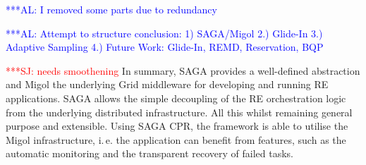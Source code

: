 \documentclass{rspublic}
\newcommand{\alnote}[1]{ {\textcolor{blue} { ***AL: #1 }}}
\newcommand{\jhanote}[1]{ {\textcolor{red} { ***SJ: #1 }}}
\newcommand{\alnote}[1]{}
\newcommand{\jhanote}[1]{}
\begin{document}
\alnote{I removed some parts due to redundancy}
% 
% 




                    
\alnote{Attempt to structure conclusion:
1) SAGA/Migol 2.) Glide-In 3.) Adaptive Sampling 4.) Future Work: Glide-In, REMD, Reservation, BQP}
                                         
\jhanote{needs smoothening} In summary, SAGA provides a well-defined abstraction 
and Migol the underlying Grid middleware for developing and running
RE applications.
SAGA allows the simple decoupling of the RE orchestration 
logic from the underlying distributed infrastructure. All this whilst remaining
general purpose and extensible. 
Using SAGA CPR, the framework is able to utilise the Migol infrastructure, 
i.\,e. the application can benefit from features, such as the automatic 
monitoring and the transparent recovery of failed tasks.  
                 
\end{document}
